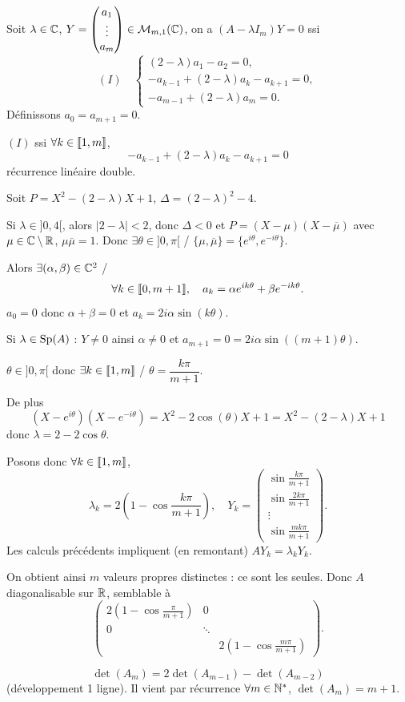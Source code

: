 \begin{solution}
Soit $\lambda\in\mathbb C$, $Y=\begin{pmatrix}a_1\\ \vdots\\ a_m\end{pmatrix}
\in\mathcal M_{m,1}(\mathbb C)$, on a $(A-\lambda I_m)Y=0$ ssi
\[
(I)\quad
\begin{cases}
(2-\lambda)a_1-a_2=0,\\
-a_{k-1}+(2-\lambda)a_k-a_{k+1}=0,\\
-a_{m-1}+(2-\lambda)a_m=0.
\end{cases}
\]
Définissons $a_0=a_{m+1}=0$.

$(I)$ ssi $\forall k\in\llbracket 1,m\rrbracket$,
\[
-a_{k-1}+(2-\lambda)a_k-a_{k+1}=0
\]
récurrence linéaire double.

Soit $P=X^2-(2-\lambda)X+1$, $\Delta=(2-\lambda)^2-4$.

Si $\lambda\in]0,4[$, alors $|2-\lambda|<2$, donc $\Delta<0$ et
$P=(X-\mu)(X-\overline\mu)$ avec $\mu\in\mathbb C\setminus\mathbb R$, $\mu\overline\mu=1$.
Donc $\exists\theta\in]0,\pi[$ / $\{\mu,\overline\mu\}=\{e^{i\theta},e^{-i\theta}\}$.

Alors $\exists(\alpha,\beta)\in\mathbb C^2$ /
\[
\forall k\in\llbracket 0,m+1\rrbracket,\quad
a_k=\alpha e^{ik\theta}+\beta e^{-ik\theta}.
\]
$a_0=0$ donc $\alpha+\beta=0$ et
$a_k=2i\alpha\sin(k\theta)$.

Si $\lambda\in\operatorname{Sp}(A)$ : $Y\neq0$ ainsi $\alpha\neq0$ et
$a_{m+1}=0=2i\alpha\sin((m+1)\theta)$.

$\theta\in]0,\pi[$ donc $\exists k\in\llbracket 1,m\rrbracket$ /
$\theta=\dfrac{k\pi}{m+1}$.

De plus
\[
(X-e^{i\theta})(X-e^{-i\theta})
=X^2-2\cos(\theta)X+1
=X^2-(2-\lambda)X+1
\]
donc $\lambda=2-2\cos\theta$.

Posons donc $\forall k\in\llbracket 1,m\rrbracket$,
\[
\lambda_k=2\left(1-\cos\frac{k\pi}{m+1}\right),
\quad
Y_k=\begin{pmatrix}
\sin\frac{k\pi}{m+1}\\
\sin\frac{2k\pi}{m+1}\\
\vdots\\
\sin\frac{mk\pi}{m+1}
\end{pmatrix}.
\]
Les calculs précédents impliquent (en remontant) $AY_k=\lambda_kY_k$.

On obtient ainsi $m$ valeurs propres distinctes : ce sont les seules.
Donc $A$ diagonalisable sur $\mathbb R$, semblable à
\[
\begin{pmatrix}
2(1-\cos\frac{\pi}{m+1})&0\\
0&\ddots\\
&&2(1-\cos\frac{m\pi}{m+1})
\end{pmatrix}.
\]

\begin{remarkbox}
\[
\det(A_m)=2\det(A_{m-1})-\det(A_{m-2})
\]
(développement 1\iere{} ligne). Il vient par récurrence
$\forall m\in\mathbb N^*$, $\det(A_m)=m+1$.
\end{remarkbox}
\end{solution}
